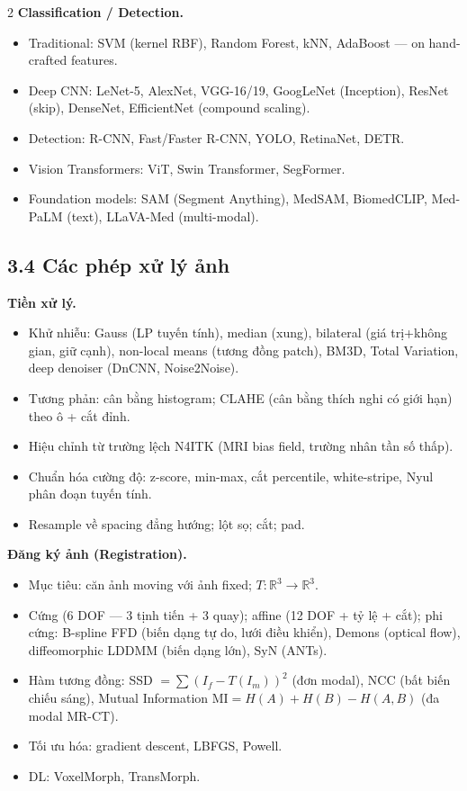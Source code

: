 \begin{paracol}{2}
\textbf{Classification / Detection.}
\begin{itemize}[leftmargin=*,nosep]
  \item Traditional: SVM (kernel RBF), Random Forest, kNN, AdaBoost — on hand-crafted features.
  \item Deep CNN: LeNet-5, AlexNet, VGG-16/19, GoogLeNet (Inception), ResNet (skip), DenseNet, EfficientNet (compound scaling).
  \item Detection: R-CNN, Fast/Faster R-CNN, YOLO, RetinaNet, DETR.
  \item Vision Transformers: ViT, Swin Transformer, SegFormer.
  \item Foundation models: SAM (Segment Anything), MedSAM, BiomedCLIP, Med-PaLM (text), LLaVA-Med (multi-modal).
\end{itemize}

\switchcolumn

\subsection*{3.4 Các phép xử lý ảnh}
\textbf{Tiền xử lý.}
\begin{itemize}[leftmargin=*,nosep]
  \item Khử nhiễu: Gauss (LP tuyến tính), median (xung), bilateral (giá trị+không gian, giữ cạnh), non-local means (tương đồng patch), BM3D, Total Variation, deep denoiser (DnCNN, Noise2Noise).
  \item Tương phản: cân bằng histogram; CLAHE (cân bằng thích nghi có giới hạn) theo ô + cắt đỉnh.
  \item Hiệu chỉnh từ trường lệch N4ITK (MRI bias field, trường nhân tần số thấp).
  \item Chuẩn hóa cường độ: z-score, min-max, cắt percentile, white-stripe, Nyul phân đoạn tuyến tính.
  \item Resample về spacing đẳng hướng; lột sọ; cắt; pad.
\end{itemize}

\textbf{Đăng ký ảnh (Registration).}
\begin{itemize}[leftmargin=*,nosep]
  \item Mục tiêu: căn ảnh moving với ảnh fixed; $T:\mathbb R^3\to\mathbb R^3$.
  \item Cứng (6 DOF — 3 tịnh tiến + 3 quay); affine (12 DOF + tỷ lệ + cắt); phi cứng: B-spline FFD (biến dạng tự do, lưới điều khiển), Demons (optical flow), diffeomorphic LDDMM (biến dạng lớn), SyN (ANTs).
  \item Hàm tương đồng: SSD $=\sum(I_f-T(I_m))^2$ (đơn modal), NCC (bất biến chiếu sáng), Mutual Information $\mathrm{MI}=H(A)+H(B)-H(A,B)$ (đa modal MR-CT).
  \item Tối ưu hóa: gradient descent, LBFGS, Powell.
  \item DL: VoxelMorph, TransMorph.
\end{itemize}


\end{paracol}
